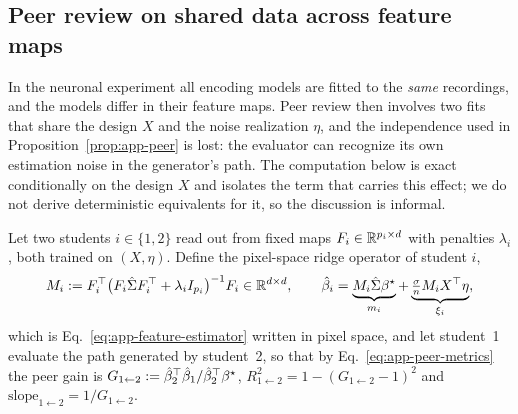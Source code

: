 \subsection{Peer review on shared data across feature maps}
\label{sec:app-peer-shared}

In the neuronal experiment all encoding models are fitted to the \emph{same}
recordings, and the models differ in their feature maps.  Peer review then
involves two fits that share the design $X$ and the noise realization
$\eta$, and the independence used in Proposition~\ref{prop:app-peer} is
lost: the evaluator can recognize its own estimation noise in the
generator's path. {The computation below is exact conditionally on the design $X$ and isolates the term that carries this effect; we do not derive deterministic equivalents for it, so the discussion is informal.}

Let two students $i\in\{1,2\}$ read out from fixed maps
$F_i\in\mathbb{R}^{p_i\times d}$ with penalties $\lambda_i$, both trained on
$(X,\eta)$.  Define the pixel-space ridge operator of student $i$,
\begin{equation}
M_i:=F_i^\top\big(F_i\hat\Sigma F_i^\top+\lambda_iI_{p_i}\big)^{-1}F_i\in\mathbb{R}^{d\times d},
\qquad
\hat{\beta}_i=\underbrace{M_i\hat\Sigma{\beta^{\star}}}_{m_i}+\underbrace{\tfrac{\sigma}{n}M_iX^\top\eta}_{\xi_i},
\label{eq:app-shared-smoother}
\end{equation}
which is Eq.~\ref{eq:app-feature-estimator} written in pixel space, and let
student~1 evaluate the path generated by student~2, so that by
Eq.~\ref{eq:app-peer-metrics} the peer gain is
$G_{1\leftarrow2}:={\hat{\beta}_2}^\top\hat{\beta}_1/{\hat{\beta}_2}^\top{\beta^{\star}}$,
$R^2_{1\leftarrow2}=1-(G_{1\leftarrow2}-1)^2$ and
$\mathrm{slope}_{1\leftarrow2}=1/G_{1\leftarrow2}$.

